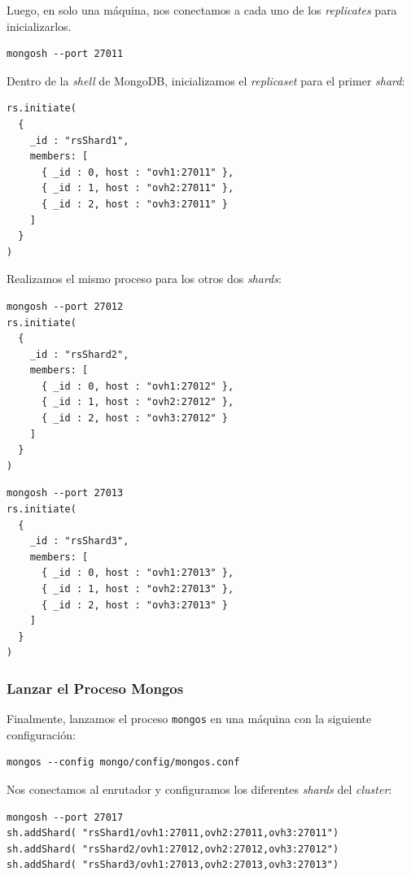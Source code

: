 \noindent Luego, en solo una máquina, nos conectamos a cada uno de los \textit{replicates} para inicializarlos.

\begin{verbatim}
mongosh --port 27011
\end{verbatim}

\noindent Dentro de la \textit{shell} de MongoDB, inicializamos el \textit{replicaset} para el primer \textit{shard}:

\begin{verbatim}
rs.initiate(
  {
    _id : "rsShard1",
    members: [
      { _id : 0, host : "ovh1:27011" },
      { _id : 1, host : "ovh2:27011" },
      { _id : 2, host : "ovh3:27011" }
    ]
  }
)
\end{verbatim}

\noindent Realizamos el mismo proceso para los otros dos \textit{shards}:

\begin{verbatim}
mongosh --port 27012
rs.initiate(
  {
    _id : "rsShard2",
    members: [
      { _id : 0, host : "ovh1:27012" },
      { _id : 1, host : "ovh2:27012" },
      { _id : 2, host : "ovh3:27012" }
    ]
  }
)
\end{verbatim}

\begin{verbatim}
mongosh --port 27013
rs.initiate(
  {
    _id : "rsShard3",
    members: [
      { _id : 0, host : "ovh1:27013" },
      { _id : 1, host : "ovh2:27013" },
      { _id : 2, host : "ovh3:27013" }
    ]
  }
)
\end{verbatim}

\subsubsection*{Lanzar el Proceso Mongos}

Finalmente, lanzamos el proceso \texttt{mongos} en una máquina con la siguiente configuración:

\begin{verbatim}
mongos --config mongo/config/mongos.conf
\end{verbatim}

\noindent Nos conectamos al enrutador y configuramos los diferentes \textit{shards} del \textit{cluster}:

\begin{verbatim}
mongosh --port 27017
sh.addShard( "rsShard1/ovh1:27011,ovh2:27011,ovh3:27011")
sh.addShard( "rsShard2/ovh1:27012,ovh2:27012,ovh3:27012")
sh.addShard( "rsShard3/ovh1:27013,ovh2:27013,ovh3:27013")
\end{verbatim}

